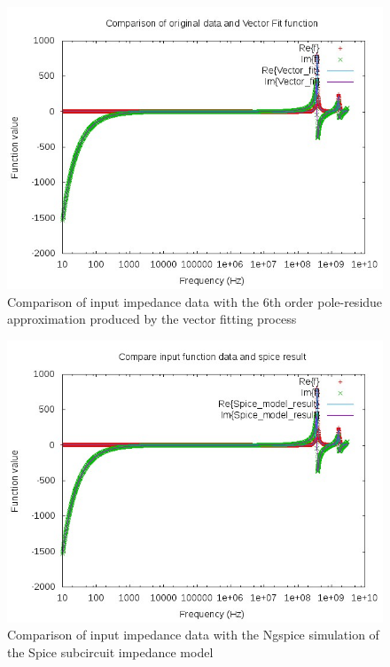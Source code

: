 \begin{figure}[h]
\centering
\includegraphics[scale=0.75]{./Imgs/Z_Vfit.jpg}
\caption{Comparison of input impedance data with the 6th order pole-residue approximation produced by the vector fitting process}
\label{fig:Z_Vfit}
\end{figure}

\begin{figure}[h]
\centering
\includegraphics[scale=0.75]{./Imgs/Z_spice.jpg}
\caption{Comparison of input impedance data with the Ngspice simulation of the Spice subcircuit impedance model}
\label{fig:Z_Vfit}
\end{figure}

 
